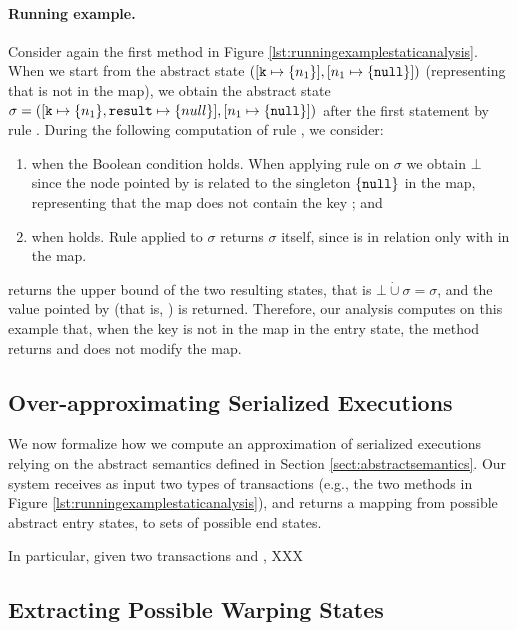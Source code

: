 \paragraph{Running example.}
Consider again the first method in Figure \ref{lst:runningexamplestaticanalysis}. When we start from the abstract state  $([\mathtt{k} \mapsto \{n_1\}], [n_1 \mapsto \{\mathtt{null}\}])$ (representing that  is not in the map), we obtain the abstract state $\sigma = ([\mathtt{k} \mapsto \{n_1\}, \mathtt{result} \mapsto \{null\}], [n_1 \mapsto \{\mathtt{null}\}])$ after the first statement by rule . During the following computation of rule , we consider:
\begin{enumerate}
	\item when the Boolean condition  holds. When applying rule  on $\sigma$ we obtain $\bot$ since the node pointed by  is related to the singleton $\{\mathtt{null}\}$ in the map, representing that the map does not contain the key ; and
	\item when  holds. Rule  applied to $\sigma$ returns $\sigma$ itself, since  is in relation only with  in the map.
\end{enumerate}
 returns the upper bound of the two resulting states, that is $\bot \dot{\cup} \sigma = \sigma$, and the value pointed by  (that is, ) is returned.
Therefore, our analysis computes on this example that, when the key is not in the map in the entry state, the method returns  and does not modify the map.

\subsection{Over-approximating Serialized Executions}
We now formalize how we compute an approximation of serialized executions relying on the abstract semantics defined in Section \ref{sect:abstractsemantics}. Our system receives as input two types of transactions (e.g., the two methods in Figure \ref{lst:runningexamplestaticanalysis}), and returns a mapping from possible abstract entry states, to sets of possible end states.

In particular, given two transactions  and , XXX

\subsection{Extracting Possible Warping States}

